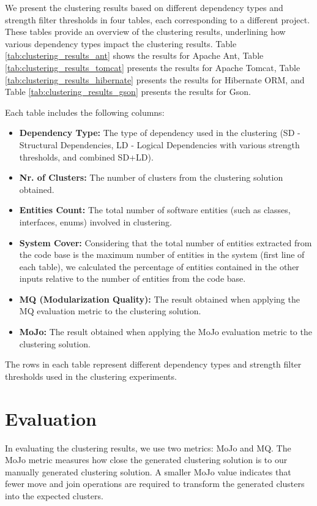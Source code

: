 \documentclass{ieeeaccess}
\begin{document}
We present the clustering results based on different dependency types and strength filter thresholds in four tables, each corresponding to a different project. These tables provide an overview of the clustering results, underlining how various dependency types impact the clustering results. Table \ref{tab:clustering_results_ant} shows the results for Apache Ant, Table \ref{tab:clustering_results_tomcat} presents the results for Apache Tomcat, Table \ref{tab:clustering_results_hibernate} presents the results for Hibernate ORM, and Table \ref{tab:clustering_results_gson} presents the results for Gson.

Each table includes the following columns:
\begin{itemize}
\item \textbf{Dependency Type:} The type of dependency used in the clustering (SD - Structural Dependencies, LD - Logical Dependencies with various strength thresholds, and combined SD+LD).
\item \textbf{Nr. of Clusters:} The number of clusters from the clustering solution obtained.
\item \textbf{Entities Count:} The total number of software entities (such as classes, interfaces, enums) involved in clustering.
\item \textbf{System Cover:} Considering that the total number of entities extracted from the code base is the maximum number of entities in the system (first line of each table), we calculated the percentage of entities contained in the other inputs relative to the number of entities from the code base.
\item \textbf{MQ (Modularization Quality):} The result obtained when applying the MQ evaluation metric to the clustering solution.
\item \textbf{MoJo:} The result obtained when applying the MoJo evaluation metric to the clustering solution.
\end{itemize}

The rows in each table represent different dependency types and strength filter thresholds used in the clustering experiments.


\section{Evaluation}
\label{sec:evaluation}

In evaluating the clustering results, we use two metrics: MoJo and MQ. The MoJo metric measures how close the generated clustering solution is to our manually generated clustering solution. A smaller MoJo value indicates that fewer move and join operations are required to transform the generated clusters into the expected clusters.
\end{document}
